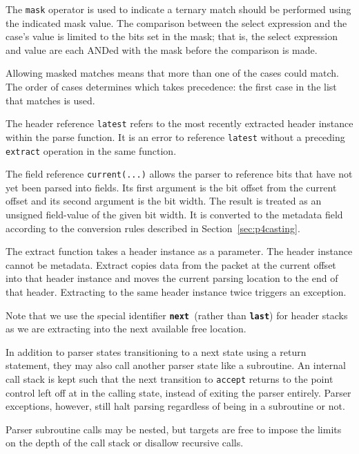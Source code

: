 \documentclass[12pt]{article}
\begin{document}
The \texttt{mask} operator is used to indicate a ternary match should be performed 
using the indicated mask value. The comparison between the select expression 
and the case's value is limited to the bits set in the mask; that is, the 
select expression and value are each ANDed with the mask before the comparison 
is made. 

Allowing masked matches means that more than one of the cases could match. The
order of cases determines which takes precedence: the first case in the list
that matches is used.

The header reference \texttt{latest} refers to the most recently extracted header 
instance within the parse function.  It is an error to reference \texttt{latest} without 
a preceding \texttt{extract} operation in the same function.

The field reference \texttt{current(...)} allows the parser to reference bits that 
have not yet been parsed into fields. Its first argument is the bit offset 
from the current offset and its second argument is the bit width.  The result 
is treated as an unsigned field-value of the given bit width. It is converted 
to the metadata field according to the conversion rules described in 
Section~\ref{sec:p4casting}.


The extract function takes a header instance as a parameter. The header instance
cannot be metadata. Extract copies data from the packet at the current offset
into that header instance and moves the current parsing location to the end of
that header. Extracting to the same header instance twice triggers an exception.

Note that we use the special identifier \texttt{\textbf{next} }(rather than
\texttt{\textbf{last}}) for header stacks as we are extracting into the next
available free location.


In addition to parser states transitioning to a next state using a return
statement, they may also call another parser state like a subroutine. An
internal call stack is kept such that the next transition to \texttt{accept}
returns to the point control left off at in the calling state, instead of
exiting the parser entirely. Parser exceptions, however, still halt parsing
regardless of being in a subroutine or not.

Parser subroutine calls may be nested, but targets are free to impose the
limits on the depth of the call stack or disallow recursive calls.
\end{document}
